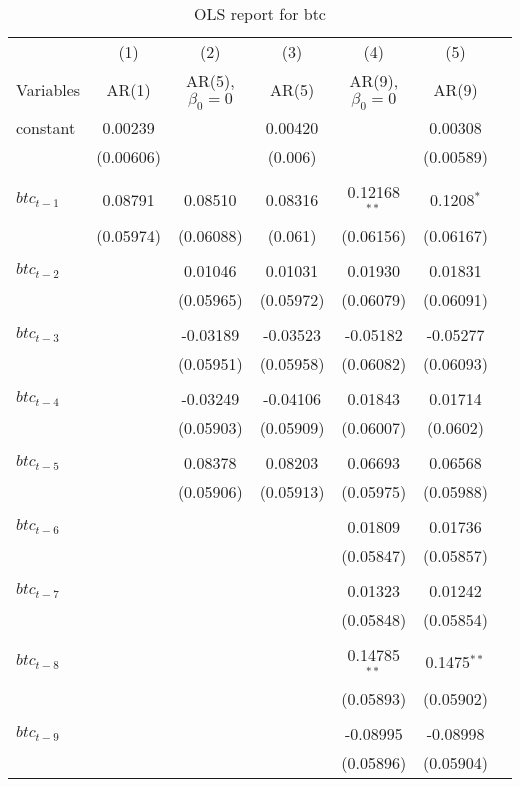 \documentclass{article}
\begin{document}
\begin{table}[h!]
\begin{center}
\begin{tabular}{lcccccc} 
     & (1) & (2) & (3)  & (4)  & (5)  \\
    Variables &  AR(1) &  AR(5), $\beta_0=0$  &  AR(5) &   AR(9), $\beta_0=0$  &  AR(9) \\
    \hline
    constant  &   0.00239  &  &  0.00420  & &  0.00308 \\
     &  (0.00606)  &  & (0.006)  & & (0.00589) \\
     & & & & & \\
    $btc_{t-1}$  &  0.08791  &  0.08510  &  0.08316  &  0.12168$^{\ast\ast}$  & 0.1208$^{\ast}$   \\
     &  (0.05974)  &  (0.06088)  &  (0.061)  &  (0.06156)  & (0.06167) \\
     & & & & & \\
    $btc_{t-2}$  &  &  0.01046   &  0.01031  &  0.01930  &  0.01831  \\
      & &  (0.05965)  &  (0.05972)  &  (0.06079)  & (0.06091) \\
      & & & & & \\
    $btc_{t-3}$  &  &  -0.03189   &  -0.03523  &  -0.05182  &  -0.05277\\
      & &  (0.05951)  &  (0.05958)  &  (0.06082)  & (0.06093) \\
      & & & & & \\
    $btc_{t-4}$  &  &  -0.03249  &  -0.04106  &  0.01843  &  0.01714   \\
      & &  (0.05903)  &  (0.05909)  &  (0.06007)  & (0.0602) \\
      & & & & & \\
    $btc_{t-5}$  &  &  0.08378  &  0.08203  &  0.06693  &  0.06568  \\
      & &  (0.05906)  &  (0.05913)  &  (0.05975)  & (0.05988) \\
      & & & & & \\
    $btc_{t-6}$  &  &  &  &   0.01809  &  0.01736 \\
      & & & &  (0.05847)  & (0.05857) \\
      & & & & & \\
    $btc_{t-7}$  &  &  &  &  0.01323  &  0.01242 \\
      & & & &  (0.05848) & (0.05854) \\
      & & & & & \\
    $btc_{t-8}$  &  &  &  &   0.14785$^{\ast\ast}$  &  0.1475$^{\ast\ast}$ \\
      & & & &  (0.05893)  & (0.05902) \\
      & & & & & \\
      $btc_{t-9}$  &  &  &  &   -0.08995  &  -0.08998 \\
      & & & &  (0.05896)  & (0.05904) \\
    \hline
\end{tabular}
\caption{OLS report for btc}
\end{center}
\end{table}
\end{document}
